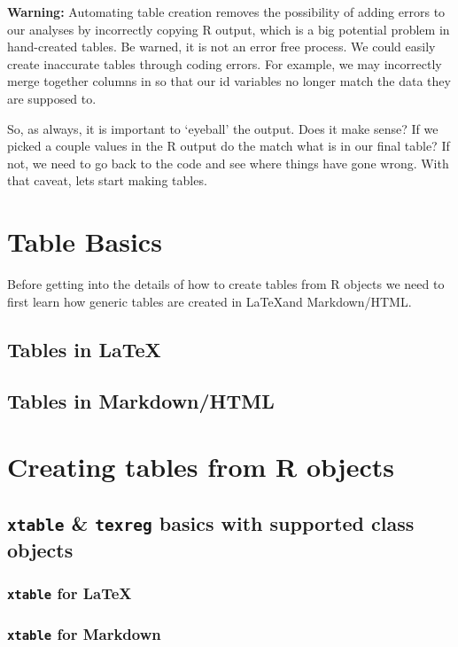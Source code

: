 \documentclass[ChapterTOCs,krantz1]{krantz}\usepackage{graphicx, color}
\begin{document}
{{\textbf{Warning:} Automating table creation removes the possibility of
adding errors to our analyses by incorrectly copying R output,
which is a big potential problem in hand-created tables. Be warned, it
is not an error free process. We could easily create inaccurate tables
through coding errors. For example, we may incorrectly merge together
columns in so that our id variables no longer match the data they are
supposed to.

So, as always, it is important to `eyeball' the output. Does it make
sense? If we picked a couple values in the R output do the
match what is in our final table? If not, we need to go back to the code
and see where things have gone wrong. With that caveat, lets start
making tables.

\section{Table Basics}

Before getting into the details of how to create tables from R objects we need to first learn how generic tables are created in \LaTeX and Markdown/HTML.

\subsection{Tables in \LaTeX}

\subsection{Tables in Markdown/HTML}

\section{Creating tables from R objects}

\subsection{\texttt{xtable} \& \texttt{texreg} basics with supported
class objects}

\subsubsection{\texttt{xtable} for \LaTeX}

\subsubsection{\texttt{xtable} for Markdown}

}}
\end{document}
